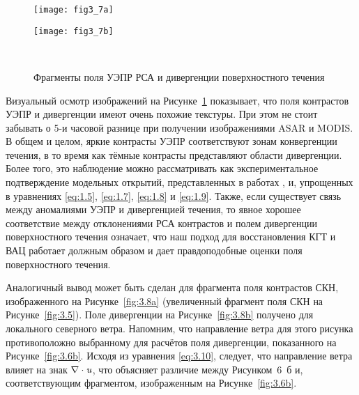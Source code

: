 \begin{figure}[H]
   	\centering
	\begin{minipage}{.47\textwidth}
	    \subcaptionbox{\label{fig:3.7a}}
		{\texttt{[image: fig3\_7a]}}
	\end{minipage}
	\hfill
	\begin{minipage}{.47\textwidth}
	    \subcaptionbox{\label{fig:3.7b}}
		{\texttt{[image: fig3\_7b]}}
	\end{minipage}
    \\
    \caption{Фрагменты поля УЭПР РСА и дивергенции поверхностного течения}
    \label{fig:3.7}
\end{figure}


Визуальный осмотр изображений на Рисунке~\ref{fig:3.7} показывает, что поля контрастов УЭПР и дивергенции имеют очень похожие текстуры. При этом не стоит забывать о 5-и часовой разнице при получении изображениями ASAR и MODIS. В общем и целом, яркие контрасты УЭПР соответствуют зонам конвергенции течения, в то время как тёмные контрасты представляют области дивергенции. Более того, это наблюдение можно рассматривать как экспериментальное подтверждение модельных открытий, представленных в работах \citep{Kudryavtsev2005,Johannessen2005}, и, упрощенных в уравнениях \eqref{eq:1.5}, \eqref{eq:1.7}, \eqref{eq:1.8} и \eqref{eq:1.9}. Также, если существует связь между аномалиями УЭПР и дивергенцией течения, то явное хорошее соответствие между отклонениями РСА контрастов и полем дивергенции поверхностного течения означает, что наш подход для восстановления КГТ и ВАЦ работает должным образом и дает правдоподобные оценки поля поверхностного течения.

Аналогичный вывод может быть сделан для фрагмента поля контрастов СКН, изображенного на Рисунке~\ref{fig:3.8a} (увеличенный фрагмент поля СКН на Рисунке~\ref{fig:3.5}). Поле дивергенции на Рисунке~\ref{fig:3.8b} получено для локального северного ветра. Напомним, что направление ветра для этого рисунка противоположно выбранному для расчётов поля дивергенции, показанного на Рисунке~\ref{fig:3.6b}. Исходя из уравнения \eqref{eq:3.10}, следует, что направление ветра влияет на знак $\nabla \cdot {\it u}$, что объясняет различие между Рисунком~6~б и, соответствующим фрагментом, изображенным на Рисунке~\ref{fig:3.6b}.



